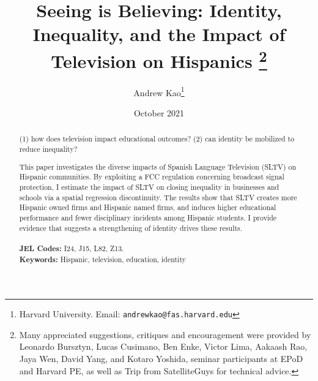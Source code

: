\documentclass[11pt]{article}
\begin{document}
\title{\textbf{Seeing is Believing: Identity, Inequality, and the Impact of Television on Hispanics}%
\thanks{Many appreciated suggestions, critiques and encouragement were provided by Leonardo Bursztyn, Lucas Cusimano, Ben Enke, Victor Lima, Aakaash Rao, Jaya Wen, David Yang, and Kotaro Yoshida, seminar participants at EPoD and Harvard PE, as well as Trip from SatelliteGuys for technical advice. }\\
}



\author{Andrew Kao\thanks{Harvard University. Email: \texttt{andrewkao@fas.harvard.edu}} }

\date{October 2021}
{\vspace{-5ex}}


\maketitle

\begin{abstract}
\noindent 
(1) how does television impact educational outcomes?
(2) can identity be mobilized to reduce inequality?

This paper investigates the diverse impacts of Spanish Language Television (SLTV) on Hispanic communities. By exploiting a FCC regulation concerning broadcast signal protection, I estimate the impact of SLTV on closing inequality in businesses and schools via a spatial regression discontinuity. The results show that SLTV creates more Hispanic owned firms and Hispanic named firms, and induces higher educational performance and fewer disciplinary incidents among Hispanic students. I provide evidence that suggests a strengthening of identity drives these results. \\\\
\textbf{JEL Codes:} I24, J15, L82, Z13.\\
\textbf{Keywords:} Hispanic, television, education, identity
\end{abstract}




\newsavebox{\tablebox} \newlength{\tableboxwidth}

\setlength{\baselineskip}{22pt}

\renewcommand{\thefootnote}{\fnsymbol{footnote}}


\thispagestyle{empty}

\newpage 
\renewcommand{\thefootnote}{\arabic{footnote}}
\end{document}
